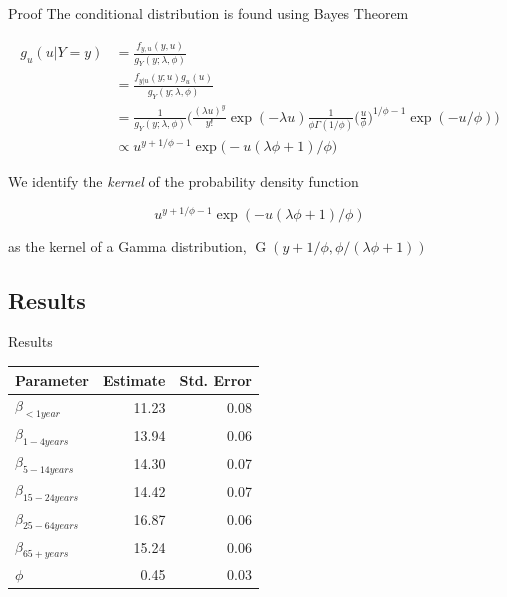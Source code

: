 \documentclass[aspectratio=169]{beamer}
\DeclareMathOperator{\G}{G}
\begin{document}
\begin{frame}{Proof}
\protect\hypertarget{proof-3}{}
The conditional distribution is found using Bayes Theorem

\begin{equation}
  \begin{aligned}
    g_{u}(u|Y=y)&=\frac{f_{y,u}(y,u)}{g_Y(y;\lambda, \phi)} \\
    &=\frac{f_{y|u}(y;u)g_{u}(u)}{g_{Y}(y;\lambda,\phi)} \\
    &=\frac{1}{g_{Y}(y;\lambda,\phi)}\bigg(\frac{(\lambda u)^y}{y!} \exp (-\lambda u) \frac{1}{\phi \Gamma(1/\phi)} \bigg(\frac{u}{\phi}\bigg)^{1/\phi-1} \exp (-u/\phi)\bigg) \\
    &\propto u^{y+1/\phi-1} \exp \big(- u(\lambda\phi+1)/\phi\big)
  \end{aligned}
\end{equation}

We identify the \emph{kernel} of the probability density function

\begin{equation}
  u^{y+1/\phi-1} \exp (- u(\lambda\phi+1)/\phi)
\end{equation}

as the kernel of a Gamma distribution,
\(\G(y+1/\phi,\phi/(\lambda\phi+1))\)
\end{frame}

\hypertarget{results-3}{%
\subsection{Results}\label{results-3}}

\begin{frame}{Results}
\tiny

\begin{table}
\centering\begingroup\fontsize{10}{12}\selectfont

\begin{tabular}{lrr}
\toprule
Parameter & Estimate & Std. Error\\
\midrule
$\beta_{<1 year}$ & 11.23 & 0.08\\
$\beta_{1-4 years}$ & 13.94 & 0.06\\
$\beta_{5-14 years}$ & 14.30 & 0.07\\
$\beta_{15-24 years}$ & 14.42 & 0.07\\
$\beta_{25-64 years}$ & 16.87 & 0.06\\
$\beta_{65+ years}$ & 15.24 & 0.06\\
$\phi$ & 0.45 & 0.03\\
\bottomrule
\end{tabular}
\endgroup{}
\end{table}

\normalsize
\end{frame}
\end{document}
